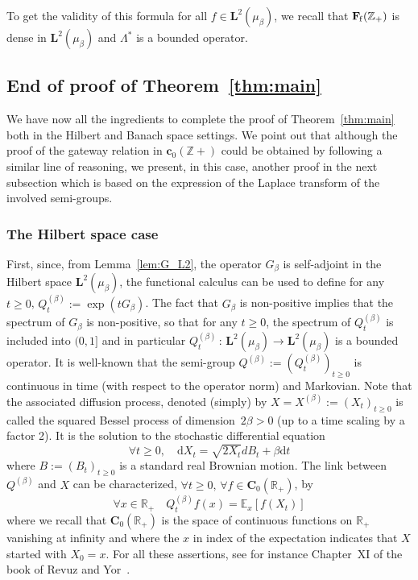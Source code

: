 \documentclass[10pt]{amsart}
\theoremstyle{definition}\newtheorem{defi}[theo]{Definition}\newtheorem{rema}[theo]{Remark}\newtheorem{exam}[theo]{Example}\newtheorem{exem}[theo]{Example}\newtheorem{nota}[theo]{Notation}
\newcommand{\df}{\mathrel{:=}}
\newcommand{\cC}{{\mathbf C}}
\newcommand{\EE}{\mathbb{E}}
\newcommand{\RR}{\mathbb{R}}
\newcommand{\ZZ}{\mathbb{Z}}
\newcommand{\ri}{\rightarrow}
\newcommand{\st}{\,:\,}
\newcommand{\Bg}{G}
\newcommand{\Bs}{Q}
\newcommand{\esL}{\mathbf{L}}
\newcommand{\esF}{\mathbf{F}}
\newcommand{\esc}{\mathbf{c}}
\newcommand{\esFf}{\esF_{\hskip-.3mm\mathrm{f}}}
\newcommand{\adjL}{\Lambda^*}
\let\oldforall\forall
\renewcommand*{\forall}{\mathrel{\oldforall}}
\newcommand*{\dd}{\mathrm{d}}
\newcommand*{\dt}{\dd t}
\begin{document}
To get the validity of this formula for all $f\in\esL^2(\mu_{\beta})$, we recall that $\esFf(\ZZ_+)$ is dense in $\esL^2(\mu_{\beta})$ and $\adjL $ is a bounded operator.

\subsection{End of proof of Theorem~\ref{thm:main}} \label{sec:proof_main}

We have now all the ingredients to complete the proof of Theorem~\ref{thm:main} both in the Hilbert and Banach space settings. We point out that although the proof of the gateway relation in $\esc_0(\ZZ+)$ could be obtained by following a similar line of reasoning, we present, in this case, another proof in the next subsection which is based on the expression of the Laplace transform of the involved semi-groups.

\subsubsection{The Hilbert space case}

First, since, from Lemma~\ref{lem:G_L2}, the operator $\Bg_{\beta}$ is self-adjoint in the Hilbert space $\esL^2(\mu_{\beta})$, the functional calculus can be used to define for any $t\geq 0$, $Q_t^{(\beta)}\df\exp(t\Bg_{\beta})$. The fact that $\Bg_{\beta}$ is non-positive implies that the spectrum of $\Bg_{\beta}$ is non-positive, so that for any $t\geq 0$, the spectrum of $\Bs_t^{(\beta)}$ is included into $(0,1]$ and in particular $\Bs^{(\beta)}_t\st \esL^2(\mu_{\beta})\ri\esL^2(\mu_{\beta})$ is a bounded operator. It is well-known that the semi-group $\Bs^{(\beta)}\df(\Bs_t^{(\beta)})_{t\geq 0}$ is continuous in time (with respect to the operator norm) and Markovian. Note that the associated diffusion process, denoted (simply) by $X=X^{(\beta)}\df(X_t)_{t\geq 0}$ is called the squared Bessel process of dimension~$2\beta>0$ (up to a time scaling by a factor 2). It is the solution to the stochastic differential equation
\begin{equation}\label{Bessel}
\forall t\geq 0,\quad \dd X_t=\sqrt{2X_t}dB_t+\beta \dt
\end{equation}
where $B\df(B_t)_{t\geq 0}$ is a standard real Brownian motion. The link between $\Bs^{(\beta)}$ and $X$ can be characterized, $\forall t\geq 0,\,\forall f\in\cC_{0}(\RR_+)$, by
\begin{equation}\label{Pb}
\forall x\in\RR_+\quad \Bs^{(\beta)}_t f(x)=\EE_{x}[f(X_t)]
\end{equation}
where we recall that $\cC_{0}(\RR_+)$ is the space of continuous functions on $\RR_+$ vanishing at infinity and where the $x$ in index of the expectation indicates that $X$ started with $X_0=x$. For all these assertions, see for instance Chapter~XI of the book of Revuz and Yor~\cite{MR1725357}.
\end{document}
